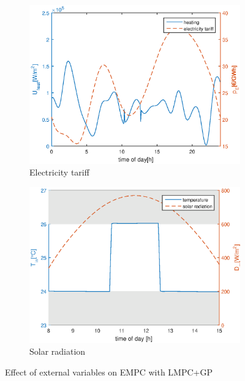 \begin{figure}[t]
	\begin{subfigure}[t]{0.49\textwidth}
		\includegraphics[width=\textwidth]{../Figures/economic_heating_electricity.eps}
		\caption{Electricity tariff}
		\label{fig:eco_heat_elec}
	\end{subfigure}
	\hfill
	\begin{subfigure}[t]{0.49\textwidth}
		\includegraphics[width=\textwidth]{../Figures/economic_temperature_solar.eps}
		\caption{Solar radiation}
		\label{fig:eco_temp_sol}
	\end{subfigure}
\caption{Effect of external variables on EMPC with LMPC+GP}
\label{fig:cons_dist}
\end{figure}

